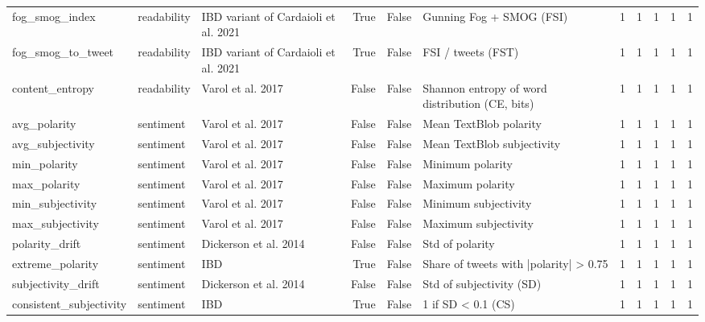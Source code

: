 \begin{tabular}{lllrrlrrrrr}
fog_smog_index & readability & IBD variant of Cardaioli et al. 2021 & True & False & Gunning Fog + SMOG (FSI) & 1 & 1 & 1 & 1 & 1 \\
fog_smog_to_tweet & readability & IBD variant of Cardaioli et al. 2021 & True & False & FSI / tweets (FST) & 1 & 1 & 1 & 1 & 1 \\
content_entropy & readability & Varol et al. 2017 & False & False & Shannon entropy of word distribution (CE, bits) & 1 & 1 & 1 & 1 & 1 \\
avg_polarity & sentiment & Varol et al. 2017 & False & False & Mean TextBlob polarity & 1 & 1 & 1 & 1 & 1 \\
avg_subjectivity & sentiment & Varol et al. 2017 & False & False & Mean TextBlob subjectivity & 1 & 1 & 1 & 1 & 1 \\
min_polarity & sentiment & Varol et al. 2017 & False & False & Minimum polarity & 1 & 1 & 1 & 1 & 1 \\
max_polarity & sentiment & Varol et al. 2017 & False & False & Maximum polarity & 1 & 1 & 1 & 1 & 1 \\
min_subjectivity & sentiment & Varol et al. 2017 & False & False & Minimum subjectivity & 1 & 1 & 1 & 1 & 1 \\
max_subjectivity & sentiment & Varol et al. 2017 & False & False & Maximum subjectivity & 1 & 1 & 1 & 1 & 1 \\
polarity_drift & sentiment & Dickerson et al. 2014 & False & False & Std of polarity & 1 & 1 & 1 & 1 & 1 \\
extreme_polarity & sentiment & IBD & True & False & Share of tweets with |polarity| > 0.75 & 1 & 1 & 1 & 1 & 1 \\
subjectivity_drift & sentiment & Dickerson et al. 2014 & False & False & Std of subjectivity (SD) & 1 & 1 & 1 & 1 & 1 \\
consistent_subjectivity & sentiment & IBD & True & False & 1 if SD < 0.1 (CS) & 1 & 1 & 1 & 1 & 1 \\
\bottomrule
\end{tabular}

